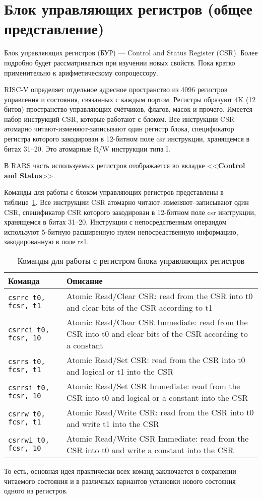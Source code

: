 \section{Блок управляющих регистров (общее представление)}

Блок управляющих регистров (БУР) --- Control and Status Register (CSR). Более подробно будет рассматриваться при изучении новых свойств. Пока кратко применительно к арифметическому сопроцессору.

RISC-V определяет отдельное адресное пространство из 4096 регистров управления и состояния, связанных с каждым портом. Регистры образуют 4K (12 битов) пространство управляющих счётчиков, флагов, масок и прочего. Имеется набор инструкций CSR, которые работают с блоком. Все инструкции CSR атомарно читают-изменяют-записывают один регистр блока, спецификатор регистра которого закодирован в 12-битном поле csr инструкции, хранящемся в битах 31–20. Это атомарные R/W инструкции типа I.

В RARS часть используемых регистров отображается во вкладке <<\textbf{Control and Status}>>.

Команды для работы с блоком управляющих регистров представлены в тиблице~\ref{table-csr-commands}.
Все инструкции CSR атомарно читают--изменяют--записывают один CSR, спецификатор CSR которого закодирован в 12-битном поле csr инструкции, хранящемся в битах 31–20. Инструкции с непосредственным операндом используют 5-битную расширенную нулем непосредственную информацию, закодированную в поле rs1.

\begin{table}[h]
    \caption{Команды для работы с регистром блока управляющих регистров}
    \centering
    \begin{tabularx}{\textwidth}{|l|X|}
        \hline
        \textbf{Команда} & \textbf{Описание} \\
        \hline \verb|csrrc t0, fcsr, t1| & Atomic Read/Clear CSR: read from the CSR into t0 and clear bits of the CSR according to t1 \\
        \hline \verb|csrrci t0, fcsr, 10| & Atomic Read/Clear CSR Immediate: read from the CSR into t0 and clear bits of the CSR according to a constant \\
        \hline \verb|csrrs t0, fcsr, t1| & Atomic Read/Set CSR: read from the CSR into t0 and logical or t1 into the CSR \\
        \hline \verb|csrrsi t0, fcsr, 10| & Atomic Read/Set CSR Immediate: read from the CSR into t0 and logical or a constant into the CSR \\
        \hline \verb|csrrw t0, fcsr, t1| & Atomic Read/Write CSR: read from the CSR into t0 and write t1 into the CSR \\
        \hline \verb|csrrwi t0, fcsr, 10| & Atomic Read/Write CSR Immediate: read from the CSR into t0 and write a constant into the CSR \\
        \hline
    \end{tabularx}
    \label{table-csr-commands}
\end{table}
То есть, основная идея практически всех команд заключается в сохранении читаемого состояния и в различных вариантов установки нового состояния одного из регистров.

